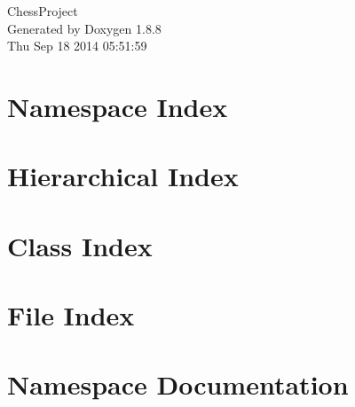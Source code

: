 \documentclass[twoside]{book}
\newcommand{\+}{\discretionary{\mbox{\scriptsize$\hookleftarrow$}}{}{}}
\newcommand{\clearemptydoublepage}{%
  \newpage{\pagestyle{empty}\cleardoublepage}%
}
\begin{document}
\begin{titlepage}
\vspace*{7cm}
\begin{center}%
{\Large Chess\+Project }\\
\vspace*{1cm}
{\large Generated by Doxygen 1.8.8}\\
\vspace*{0.5cm}
{\small Thu Sep 18 2014 05:51:59}\\
\end{center}
\end{titlepage}
\clearemptydoublepage
\tableofcontents
\clearemptydoublepage
{}

\chapter{Namespace Index}

\chapter{Hierarchical Index}

\chapter{Class Index}

\chapter{File Index}

\chapter{Namespace Documentation}








\end{document}
